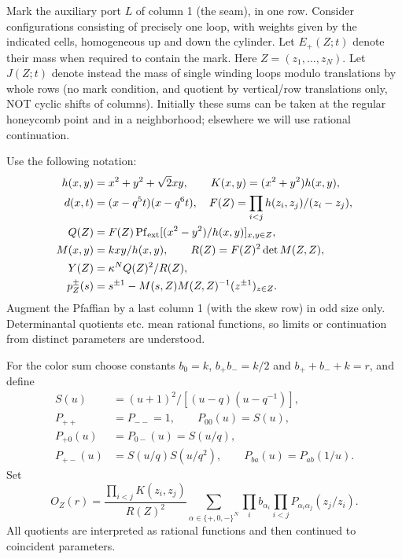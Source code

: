 \documentclass[11pt]{article}
\numberwithin{equation}{section}
\theoremstyle{definition}\newtheorem{definition}[theorem]{Definition}
\theoremstyle{remark}\newtheorem{remark}[theorem]{Remark}
\begin{document}
Mark the auxiliary port \(L\) of column 1 (the seam), in one row. Consider configurations consisting of precisely one loop, with weights given by the indicated cells, homogeneous up and down the cylinder. Let \(E_+(Z;t)\) denote their mass when required to contain the mark. Here \(Z=(z_1,\ldots,z_N)\). Let \(J(Z;t)\) denote instead the mass of single winding loops modulo translations by whole rows (no mark condition, and quotient by vertical/row translations only, NOT cyclic shifts of columns). Initially these sums can be taken at the regular honeycomb point and in a neighborhood; elsewhere we will use rational continuation.

Use the following notation:
\[
 \begin{aligned}
 h(x,y)&=x^2+y^2+\sqrt2 xy,\qquad K(x,y)=(x^2+y^2)h(x,y),\\
 d(x,t)&=(x-q^5t)(x-q^6t),\quad
 F(Z)=\prod_{i<j} h(z_i,z_j)/(z_i-z_j),\\
 Q(Z)&=F(Z)\operatorname{Pf}_{\rm ext}[(x^2-y^2)/h(x,y)]_{x,y\in Z},\\
 M(x,y)&=kxy/h(x,y),\qquad R(Z)=F(Z)^2\det M(Z,Z),\\
 Y(Z)&=\kappa^N Q(Z)^2/R(Z),\\
 p_Z^\pm(s)&=s^{\pm1}-M(s,Z) M(Z,Z)^{-1}(z^{\pm1})_{z\in Z}.
 \end{aligned}
\]
Augment the Pfaffian by a last column 1 (with the skew row) in odd size only. Determinantal quotients etc. mean rational functions, so limits or continuation from distinct parameters are understood.

For the color sum choose constants $b_0=k$, $b_+b_-=k/2$ and
$b_++b_-+k=r$, and define
\[
\begin{aligned}
 S(u)&=(u+1)^2/[(u-q)(u-q^{-1})],\\
 P_{++}&=P_{--}=1,\qquad P_{00}(u)=S(u),\\
 P_{+0}(u)&=P_{0-}(u)=S(u/q),\\
 P_{+-}(u)&=S(u/q)S(u/q^2),\qquad P_{ba}(u)=P_{ab}(1/u).
\end{aligned}
\]
Set
\begin{equation}\label{L:eq:color-definition}
 O_Z(r)=\frac{\prod_{i<j}K(z_i,z_j)}{R(Z)^2}
 \sum_{\alpha\in\{+,0,-\}^N}
 \prod_i b_{\alpha_i}\prod_{i<j}P_{\alpha_i\alpha_j}(z_j/z_i).
\end{equation}
All quotients are interpreted as rational functions and then continued to
coincident parameters.
\end{document}
